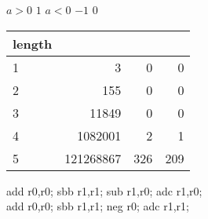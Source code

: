 \documentclass{beamer}
\renewcommand{\gets}{\leftarrow}
\newcommand{\AND}{\land}
\newcommand{\IOR}{\lor}
\newcommand{\XOR}{\oplus}
\begin{document}
%

\begin{frame}
\end{frame}

\begin{frame}
\begin{codebox}
\zi \If $a > 0$ \Do
\zi   \Return $1$ \End
\zi \If $a < 0$ \Do
\zi   \Return $-1$ \End
\zi \Return $0$
\end{codebox}
\end{frame}

\begin{frame}
\begin{table}
\tiny
\begin{tabular}{l|rrr}
length & & & \\
\hline
1 &         3 &   0 &   0 \\
2 &       155 &   0 &   0 \\
3 &     11849 &   0 &   0 \\
4 &   1082001 &   2 &   1 \\
5 & 121268867 & 326 & 209 \\
\end{tabular}
\end{table}
\end{frame}

\begin{frame}
\begin{center}
add r0,r0; sbb r1,r1; sub r1,r0; adc r1,r0; \\
add r0,r0; sbb r1,r1; neg r0; adc r1,r1;
\end{center}
\end{frame}
\end{document}
